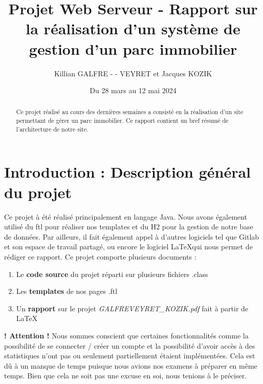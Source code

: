 \documentclass[french]{article}
\title{Projet Web Serveur - Rapport sur la réalisation d'un système de gestion d'un parc immobilier}
\author{Killian GALFRE - - VEYRET et Jacques KOZIK}
\date{Du 28 mars au 12 mai 2024}
\begin{document}
\maketitle
\tableofcontents

\begin{abstract}
Ce projet réalisé au cours des dernières semaines a consisté en la réalisation d'un site permettant de gérer un parc immobilier. Ce rapport contient un bref résumé de l'architecture de notre site.
\end{abstract}


\section{Introduction : Description général du projet}
Ce projet à été réalisé principalement en langage Java. Nous avons également utilisé du ftl pour réaliser nos templates et du H2 pour la gestion de notre base de données. Par ailleurs, il fait également appel à d'autres logiciels tel que Gitlab et son espace de travail partagé, ou encore le logiciel \LaTeX \space qui nous permet de rédiger ce rapport. Ce projet comporte plusieurs documents :
\begin{enumerate}
\item Le \textbf{code source} du projet réparti sur plusieurs fichiers .class
\item Les \textbf{templates} de nos pages .ftl
\item Un \textbf{rapport} sur le projet \textit{GALFREVEYRET\_KOZIK.pdf} fait à partir de \LaTeX \\
\end{enumerate}

\noindent\textbf{! Attention !} Nous sommes conscient que certaines fonctionnalités comme la possibilité de se connecter / créer un compte et la possibilité d'avoir accès à des statistiques n'ont pas ou seulement partiellement étaient implémentées. Cela est dû à un manque de temps puisque nous avions nos examens à préparer en même temps. Bien que cela ne soit pas une excuse en soi, nous tenions à le préciser. 
\end{document}
